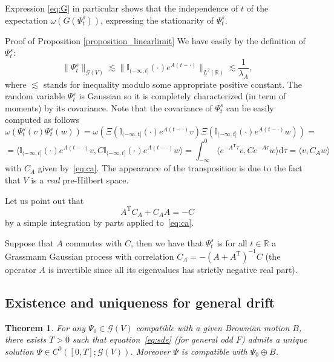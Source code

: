 \documentclass{article}
\newcommand{\Tau}{\mathrm{T}}
\newcommand{\mathd}{\mathrm{d}}
\newcommand{\tmtextit}[1]{{\itshape{#1}}}
\newenvironment{proof*}[1]{\noindent\textbf{#1\ }}{\hspace*{\fill}$\Box$\medskip}
\newtheorem{theorem}{Theorem}
\begin{document}
\begin{remark}
  Expression {\eqref{eq:G}} in particular shows that the independence of $t$
  of the expectation $\omega (G (\Psi^s_t))$, expressing the stationarity of
  $\Psi^s_t$. 
\end{remark}

\begin{proof*}{Proof of Proposition \ref{proposition_linearlimit}}
  We have easily by the definition of $\Psi^s_t$:
  \[ \| \Psi^s_t \|_{\mathcal{G} (V)} \lesssim \| \mathbb{I}_{(- \infty, t]}
     (\cdot) e^{A (t - \cdot)} \|_{L^2 (\mathbb{R})} \lesssim
     \frac{1}{\lambda_A}, \]
  where $\lesssim$ stands for inequality modulo some appropriate positive
  constant. The random variable $\Psi^s_t$ is Gaussian so it is completely
  characterized (in term of moments) by its covariance. Note that the
  covariance of $\Psi_t^s$ can be easily computed as follows
  \[ \omega (\Psi_t^s (v) \Psi_t^s (w)) = \omega (\Xi (\mathbb{I}_{(- \infty,
     t]} (\cdot) e^{A (t - \cdot)} v) \Xi (\mathbb{I}_{(- \infty, t]} (\cdot)
     e^{A (t - \cdot)} w)) = \]
  \[ = \langle \mathbb{I}_{(- \infty, t]} (\cdot) e^{A (t - \cdot)} v,
     C\mathbb{I}_{(- \infty, t]} (\cdot) e^{A (t - \cdot)} w \rangle =
     \int^0_{- \infty} \langle e^{- A^{\Tau} \tau} v, C e^{- A \tau} w \rangle
     \mathd \tau = \langle v, C_A w \rangle \]
  with $C_A$ given by~{\eqref{eq:ca}}. The appearance of the transposition is
  due to the fact that $V$ is a \tmtextit{real} pre-Hilbert space.
\end{proof*}

Let us point out that
\begin{equation}
  A^{\Tau} C_A + C_A A = - C \label{eq:relation-ca}
\end{equation}
by a simple integration by parts applied to~{\eqref{eq:ca}}.

\begin{remark}
  Suppose that $A$ commutes with $C$, then we have that $\Psi_t^s$ is for all
  $t \in \mathbb{R}$ a Grassmann Gaussian process with correlation $C_A = - (A
  + A^{\Tau})^{- 1} C$ (the operator $A$ is invertible since all its
  eigenvalues has strictly negative real part).
\end{remark}

\subsection{Existence and uniqueness for general drift}

\begin{theorem}
  \label{theorem_picard}For any $\Psi_0 \in \mathcal{G} (V)$ compatible with a
  given Brownian motion $B$, there exists $T > 0$ such that
  equation~{\eqref{eq:sde}} (for general odd $F$) admits a unique solution
  $\Psi \in C^0 ([0, T] ; \mathcal{G} (V))$. Moreover $\Psi$ is compatible
  with $\Psi_0 \oplus B$.
\end{theorem}
\end{document}
